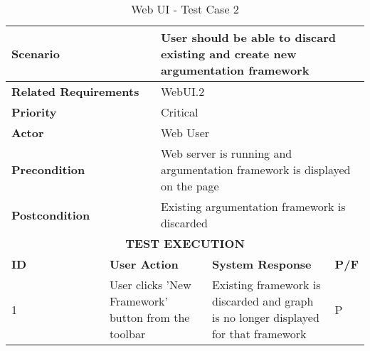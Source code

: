 \begin{longtable}[c]{p{}|p{}|p{}|p{}|p{}}
	\caption{Web UI - Test Case 2}
	\label{table:testcase2} \\
	\hline
	\multicolumn{2}{p{0.3\textwidth}}{\textbf{Scenario}} & \multicolumn{3}{p{0.7\textwidth}}{User should be able to discard existing and create new argumentation framework} \\ 
	\hline
	\endfirsthead
	\endhead
	\multicolumn{2}{p{0.4\textwidth}}{\textbf{Related Requirements}} & \multicolumn{3}{p{0.6\textwidth}}{WebUI.2} \\ 
	\hline
	\multicolumn{2}{p{0.4\textwidth}}{\textbf{Priority}} & \multicolumn{3}{p{0.6\textwidth}}{Critical} \\ 
	\hline
	\multicolumn{2}{p{0.3\textwidth}}{\textbf{Actor}} & \multicolumn{3}{p{0.7\textwidth}}{Web User} \\ 
	\hline
	\multicolumn{2}{p{0.3\textwidth}}{\textbf{Precondition}} & \multicolumn{3}{p{0.7\textwidth}}{Web server is running and argumentation framework is displayed on the page} \\ 
	\hline
	\multicolumn{2}{p{0.3\textwidth}}{\textbf{Postcondition}} & \multicolumn{3}{p{0.7\textwidth}}{Existing argumentation framework is discarded} \\ 
	\hline
	\multicolumn{5}{c}{\cellcolor{grey}\textbf{TEST EXECUTION}} \\ 
	\hline
	\textbf{ID} & \multicolumn{2}{|p{0.4\textwidth}|}{\textbf{User Action}} & \textbf{System Response} & \textbf{P/F} \\ 
	\hline
	1 & \multicolumn{2}{|p{0.4\textwidth}|}{User clicks 'New Framework' button from the toolbar} & Existing framework is discarded and graph is no longer displayed for that framework & P \\ 
	\hline
\end{longtable}

